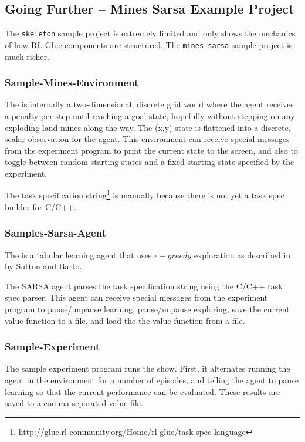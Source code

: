 \documentclass[11pt]{article}
\begin{document}
\subsection{Going Further -- Mines Sarsa Example Project}
\label{mines-sarsa-sample}
The \texttt{skeleton} sample project is extremely limited and only shows the mechanics of how RL-Glue components are structured.  The \texttt{mines-sarsa} sample project is much richer.

\subsubsection{Sample-Mines-Environment}
\label{mines-sample}
The 
is internally a two-dimensional, discrete grid world where the agent receives a penalty per step until reaching a goal state, hopefully without stepping on any exploding land-mines along the way.  The (x,y) state is flattened into a discrete, scalar observation for the agent.  This environment can receive special messages from the experiment program to print the current state to the screen, and also to toggle between random starting states and a fixed starting-state specified by the experiment.

The task specification string\footnote{\url{http://glue.rl-community.org/Home/rl-glue/task-spec-language}} is manually because there is not yet a task spec builder for C/C++. 

\subsubsection{Samples-Sarsa-Agent}
\label{sarsa-sample}
The 
is a tabular learning agent that uses $\epsilon-greedy$ exploration as described in  by Sutton and Barto.

The SARSA agent parses the task specification string using the C/C++ task spec parser.  This agent can receive special messages from the experiment program to pause/unpause learning, pause/unpause exploring, save the current value function to a file, and load the the value function from a file.

\subsubsection{Sample-Experiment}
The sample experiment program runs the show.  First, it alternates running the agent in the environment for a number of episodes, and telling the agent to pause learning so that the current performance can be evaluated.  These results are saved to a comma-separated-value file.
\end{document}
